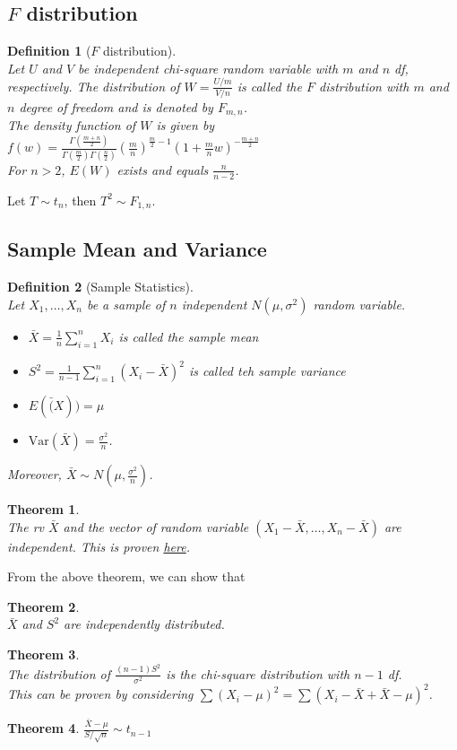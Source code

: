 \documentclass[12pt]{article}
\newcommand{\var}{\mathrm{Var}}
\newtheorem{definition}{Definition}[section]
\newtheorem{theorem}{Theorem}[section]
\theoremstyle{definition}
\begin{document}
\subsection{{$F$} distribution}
\begin{definition}[{$F$} distribution]
\hfill\\\normalfont Let $U$ and $V$ be independent chi-square random variable with $m$ and $n$ df, respectively. The distribution of
$
W=\frac{U/m}{V/n}
$
is called the $F$ distribution with $m$ and $n$ degree of freedom and is denoted by $F_{m,n}$.\\
The density function of $W$ is given by\\
$
f(w) = \frac{\Gamma(\frac{m+n}{2})}{\Gamma(\frac{m}{2})\Gamma(\frac{n}{2})}(\frac{m}{n})^{\frac{m}{2}-1}(1+\frac{m}{n}w)^{-\frac{m+n}{2}}
$\\
For $n>2$, $E(W)$ exists and equals $\frac{n}{n-2}$.
\end{definition}
Let $T\sim t_n$, then $T^2\sim F_{1,n}$.
\subsection{Sample Mean and Variance}
\begin{definition}[Sample Statistics]
\hfill\\\normalfont Let $X_1,\ldots, X_n$ be a sample of $n$ independent $N(\mu,\sigma^2)$ random variable.
\begin{itemize}
  \item $\bar{X}=\frac{1}{n}\sum_{i=1}^n X_i$ is called the sample mean
  \item $S^2 = \frac{1}{n-1} \sum_{i=1}^n (X_i-\bar{X})^2$ is called teh sample variance
  \item $E(\bar(X)) = \mu$
  \item $\var(\bar{X}) = \frac{\sigma^2}{n}$. 
\end{itemize}
Moreover, $\bar{X}\sim N(\mu, \frac{\sigma^2}{n})$.
\end{definition}
\begin{theorem}
\hfill\\\normalfont The rv $\bar{X}$ and the vector of random variable $(X_1-\bar{X},\ldots, X_n-\bar{X})$ are independent. This is proven \href{https://www.stat.nus.edu.sg/~stalohwl/lecture2.pdf}{here}.
\end{theorem}
From the above theorem, we can show that 
\begin{theorem}
\hfill\\\normalfont $\bar{X}$ and $S^2$ are independently distributed.
\end{theorem}
\begin{theorem}
\hfill\\\normalfont The distribution of $\frac{(n-1)S^2}{\sigma^2}$ is the chi-square distribution with $n-1$ df. \\This can be proven by considering $\sum(X_i-\mu)^2 = \sum(X_i-\bar{X}+\bar{X}-\mu)^2$.
\end{theorem}
\begin{theorem}
$
\frac{\bar{X}-\mu}{S/\sqrt{n}}\sim t_{n-1}
$
\end{theorem}
\end{document}

